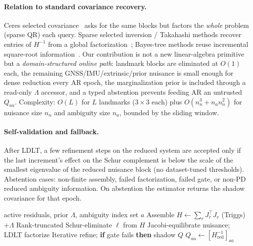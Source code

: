 \documentclass[letterpaper, journal, twocolumn]{IEEEtran}
\begin{document}
\paragraph{Relation to standard covariance recovery.}
Ceres selected covariance~\cite{agarwal2023ceres} asks for the same blocks but
factors the \emph{whole} problem (sparse QR) each query.
Sparse selected inversion / Takahashi methods recover entries of $H^{-1}$ from
a global factorization~\cite{erisman1975sparse,li2008selected}; Bayes-tree
methods reuse incremental square-root information~\cite{kaess2012isam2}.
Our contribution is not a new linear-algebra primitive but a
\emph{domain-structured online path}: landmark blocks are eliminated at
$O(1)$ each, the remaining GNSS/IMU/extrinsic/prior nuisance is small enough
for dense reduction every AR epoch, the marginalization prior is included
through a read-only $\Lambda$ accessor, and a typed abstention prevents feeding
AR an untrusted $Q_{aa}$.
Complexity: $O(L)$ for $L$ landmarks ($3\times3$ each) plus
$O(n_n^3+n_a n_n^2)$ for nuisance size $n_n$ and ambiguity size $n_a$,
bounded by the sliding window.

\paragraph{Self-validation and fallback.}
After LDLT, a few refinement steps on the reduced system are accepted only if
the last increment's effect on the Schur complement is below the scale of the
smallest eigenvalue of the reduced nuisance block (no dataset-tuned
thresholds).
Abstention cases: non-finite assembly, failed factorization, failed gate, or
non-PD reduced ambiguity information.
On abstention the estimator returns the shadow covariance for that epoch.

\begin{algorithm}[!t]
\caption{Exact-in-window marginal ambiguity covariance}
\label{alg:cov}
\begin{algorithmic}[1]
\Require active residuals, prior $\Lambda$, ambiguity index set $a$
\State Assemble $H\leftarrow\sum_r J_r^\top J_r$ (Triggs) $+\Lambda$
  \State Rank-truncated Schur-eliminate $\ell$ from $H$
\EndFor
\State Jacobi-equilibrate nuisance; LDLT factorize
\State Iterative refine; \textbf{if} gate fails \textbf{then} \Return shadow $Q$
\State \Return $Q_{aa}\leftarrow[H_{\mathrm{red}}^{-1}]_{aa}$
\end{algorithmic}
\end{algorithm}
\end{document}
